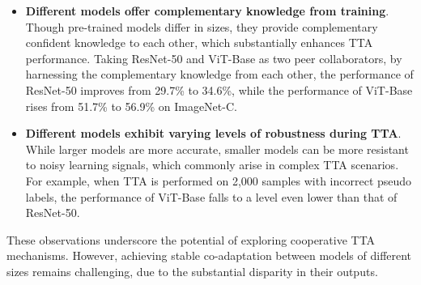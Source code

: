 \begin{itemize}

     \item \textbf{Different models offer complementary knowledge from training}.
     Though pre-trained models differ in sizes, they provide complementary confident knowledge to each other, which substantially enhances TTA performance. Taking ResNet-50 and ViT-Base as two peer collaborators, by harnessing the complementary knowledge from each other, the performance of ResNet-50 improves from 29.7\% to 34.6\%, while the performance of ViT-Base rises from 51.7\% to 56.9\% on ImageNet-C. 
     \item \textbf{Different models exhibit varying levels of robustness during TTA}. 
     While larger models are more accurate, smaller models can be more resistant to noisy learning signals, which commonly arise in complex TTA scenarios. 
     For example, when TTA is performed on 2,000 samples with incorrect pseudo labels, the performance of ViT-Base falls to a level even lower than that of ResNet-50.
\end{itemize}
These observations underscore the potential of exploring cooperative TTA mechanisms. However, achieving stable co-adaptation between models of different sizes remains challenging, due to the substantial disparity in their outputs.





